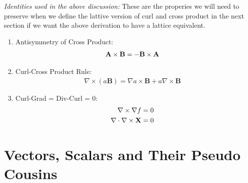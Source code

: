 \documentclass[11pt, oneside]{article} %
\numberwithin{equation}{section}
\begin{document}
\begin{shaded}
    \textit{Identities used in the above discussion:} These are the properies we will need to preserve when we define the lattive version of curl and cross product in the next section if we want the above derivation to have a lattice equivalent. 
    \begin{enumerate}
    \item Antisymmetry of Cross Product:
        \begin{align} \label{id:cross_antisym}
            \textbf A \times  \textbf B = -
            \textbf B \times  \textbf A
        \end{align}
    
    \item Curl-Cross Product Rule:
        \begin{align} \label{id:curl_cross}
            \nabla \times (a \textbf{B}) = \nabla a \times \textbf{B} + a \nabla \times \textbf{B}
        \end{align}
    \item Curl-Grad = Div-Curl = 0:
    \begin{align}
        \nabla \times \nabla  f &= 0 \\
        \nabla \cdot \nabla \times \textbf  X &= 0 
    \end{align}
    
    \end{enumerate}
\end{shaded}

\section{Vectors, Scalars and Their Pseudo Cousins}
\end{document}

